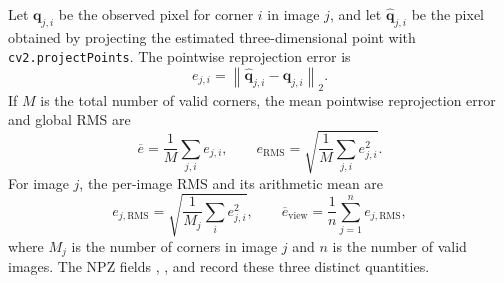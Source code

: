 Let \(\mathbf q_{j,i}\) be the observed pixel for corner \(i\) in image \(j\), and let
\(\widehat{\mathbf q}_{j,i}\) be the pixel obtained by projecting the estimated three-dimensional point with \texttt{cv2.projectPoints}. The pointwise reprojection error is
\begin{equation}
e_{j,i}=\left\lVert\widehat{\mathbf q}_{j,i}-\mathbf q_{j,i}\right\rVert_{2}.
\label{eq:task2-point-reprojection}
\end{equation}
If \(M\) is the total number of valid corners, the mean pointwise reprojection error and global RMS are
\begin{equation}
\overline e=\frac{1}{M}\sum_{j,i}e_{j,i},\qquad
e_{\mathrm{RMS}}=
\sqrt{\frac{1}{M}\sum_{j,i}e_{j,i}^{2}}.
\label{eq:task2-reprojection-error}
\end{equation}
For image \(j\), the per-image RMS and its arithmetic mean are
\begin{equation}
e_{j,\mathrm{RMS}}=
\sqrt{\frac{1}{M_j}\sum_i e_{j,i}^{2}},\qquad
\overline e_{\mathrm{view}}=
\frac{1}{n}\sum_{j=1}^{n}e_{j,\mathrm{RMS}},
\label{eq:task2-per-image-rms}
\end{equation}
where \(M_j\) is the number of corners in image \(j\) and \(n\) is the number of valid images. The NPZ fields , , and  record these three distinct quantities.
